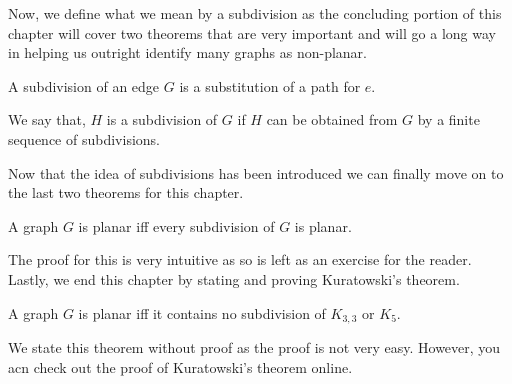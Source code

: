 \documentclass[../basic_graph_theory.tex]{subfiles}
\begin{document}
Now, we define what we mean by a subdivision as the concluding portion of this chapter will cover two theorems that are very important and will go a long way in helping us outright identify many graphs as non-planar.\\

\begin{Def}{}{}
    A subdivision of an edge $G$ is a substitution of a path for $e$.
\end{Def}
\begin{Def}{}{}
    We say that, $H$ is a subdivision of $G$ if $H$ can be obtained from $G$ by a finite sequence of subdivisions.
\end{Def}

Now that the idea of subdivisions has been introduced we can finally move on to the last two theorems for this chapter.
\begin{Thm}{}{}
    A graph $G$ is planar iff every subdivision of $G$ is planar.
\end{Thm}
The proof for this is very intuitive as so is left as an exercise for the reader.\\
Lastly, we end this chapter by stating and proving Kuratowski's theorem.\\
\begin{Thm}{}{}
    A graph $G$ is planar iff it contains no subdivision of $K_{3,3}$ or $K_{5}$.
\end{Thm}
We state this theorem without proof as the proof is not very easy. However, you acn check out the proof of Kuratowski's theorem online.
\end{document}
